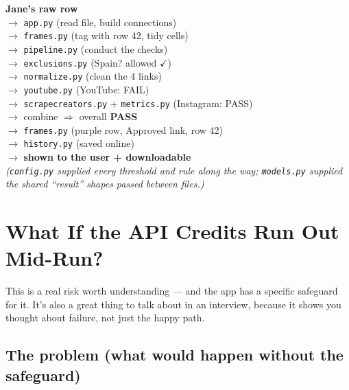 \documentclass[11pt]{article}
\newcommand{\file}[1]{\texttt{\color{inkdark}#1}}
\begin{document}
\begin{plainbox}
\small
\textbf{Jane's raw row} \\
$\rightarrow$ \file{app.py} (read file, build connections) \\
$\rightarrow$ \file{frames.py} (tag with row 42, tidy cells) \\
$\rightarrow$ \file{pipeline.py} (conduct the checks) \\
\hspace{1.2em}$\rightarrow$ \file{exclusions.py} (Spain? allowed $\checkmark$) \\
\hspace{1.2em}$\rightarrow$ \file{normalize.py} (clean the 4 links) \\
\hspace{1.2em}$\rightarrow$ \file{youtube.py} (YouTube: FAIL) \\
\hspace{1.2em}$\rightarrow$ \file{scrapecreators.py} + \file{metrics.py} (Instagram: PASS) \\
\hspace{1.2em}$\rightarrow$ combine $\Rightarrow$ overall \textbf{PASS} \\
$\rightarrow$ \file{frames.py} (purple row, Approved link, row 42) \\
$\rightarrow$ \file{history.py} (saved online) \\
$\rightarrow$ \textbf{shown to the user + downloadable} \\[4pt]
\emph{(\file{config.py} supplied every threshold and rule along the way;
\file{models.py} supplied the shared ``result'' shapes passed between files.)}
\end{plainbox}

\newpage

\section{What If the API Credits Run Out Mid-Run?}

This is a real risk worth understanding — and the app has a specific safeguard
for it. It's also a great thing to talk about in an interview, because it shows
you thought about failure, not just the happy path.

\subsection{The problem (what would happen without the safeguard)}
\end{document}
